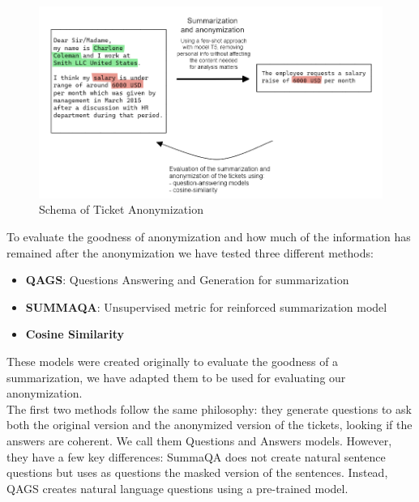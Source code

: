 \begin{figure}[h] 
    \includegraphics[width=\textwidth]{images/ticket_anonymization_schema.png}
    \caption{Schema of Ticket Anonymization}
    \label{fig:schema_ticket_anonymization}
\end{figure}    
To evaluate the goodness of anonymization and how much of the information has remained after the anonymization we have tested three different methods:
\begin{itemize}
    \item \textbf{QAGS}: Questions Answering and Generation for summarization
    \item \textbf{SUMMAQA}: Unsupervised metric for reinforced summarization model 
    \item \textbf{Cosine Similarity}
\end{itemize}  
These models were created originally to evaluate the goodness of a summarization, we have adapted them to be used for evaluating our anonymization. \\
The first two methods follow the same philosophy: they generate questions to ask both the original version and the anonymized version of the tickets, looking if the answers are coherent. We call them Questions and Answers models.
However, they have a few key differences: SummaQA does not create natural sentence questions but uses as questions the masked version of the sentences. Instead, QAGS creates natural language questions using a pre-trained model.
